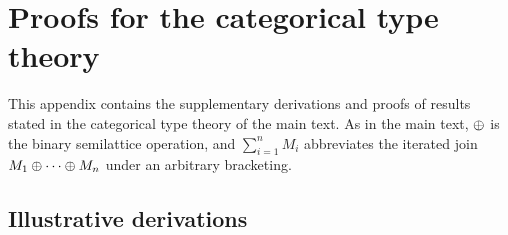 \section{Proofs for the categorical type theory}
\label{app:proofs}

This appendix contains the supplementary derivations and proofs of results stated in the categorical type theory of the main text.  As in the main text, $\mathbin{\oplus}$ is the binary semilattice operation, and $\sum_{i=1}^{n}M_i$ abbreviates the iterated join $M_1\mathbin{\oplus}\cdots\mathbin{\oplus} M_n$ under an arbitrary bracketing.

\subsection{Illustrative derivations}
\label{app:derivations}

